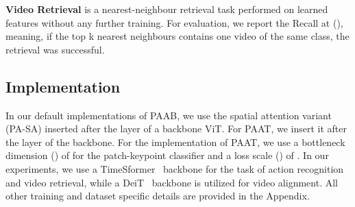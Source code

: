\documentclass{article}
\newcommand{\red}[1]{\textcolor{red}{#1}}
\begin{document}
\textbf{Video Retrieval} is a nearest-neighbour retrieval task performed on learned features without any further training. 
For evaluation, we report the Recall at  (), meaning, if the top k nearest neighbours contains one video of the same class, the retrieval was successful.



\subsection{Implementation}
In our default implementations of PAAB, we use the spatial attention variant (PA-SA) inserted after the  layer of a backbone ViT. For PAAT, we insert it after the  layer of the backbone. For the implementation of PAAT, we use a bottleneck dimension () of  for the patch-keypoint classifier and a loss scale () of . In our experiments, we use a TimeSformer~\cite{timesformer} backbone for the task of action recognition and video retrieval, while a DeiT~\cite{deit} backbone is utilized for video alignment. All other training and dataset specific details are provided in the Appendix. 
\iffalse
\textbf{Action recognition}\quad In all experiments, we follow a training pipeline similar to \cite{timesformer}. The RGB inputs to our models are video frames with a size of  for Smarthome and N-UCLA and a size of  for NTU. Frames are sampled at a rate of  for Smarthome and  for NTU and N-UCLA. To ensure that the video frames input to our model will contain pose keypoints, prior to sampling frames we first extract a  crop~\cite{fasterrcnn_humandetector} from the video that contains only the human subject.
The backbone model in which we insert PAAB and PAAT is a Kinetics 400 \cite{kinetics} pretrained TimeSformer \cite{timesformer} model, for our experiments we fine-tune the model for  epochs.


\textbf{Multi-view robotic video alignment}\quad We use DeiT as a backbone architecture for inserting PAAT and PAAB and use the time-contrastive loss \cite{sermanet2017tcn_robotalign} for training our models. The training enforces that the distance between frame embeddings are close if the frames are temporally close, but far if the frames are temporally distant. We train all of our models from scratch for \red{How many epochs?} epochs.

\fi
\end{document}
